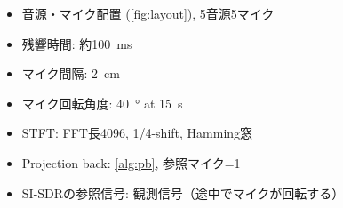 \documentclass[twocolumn,9pt,dvipdfmx]{article}
\begin{document}
\begin{itemize}
  \item 音源・マイク配置 (\cref{fig:layout}), 5音源5マイク
  \item 残響時間: 約\SI{100}{\milli\second}
  \item マイク間隔: \SI{2}{\centi\metre}
  \item マイク回転角度: \SI{40}{\degree} at \SI{15}{\second}
  \item STFT: FFT長4096, 1/4-shift, Hamming窓
  \item Projection back: \cref{alg:pb}, 参照マイク=1
  \item SI-SDRの参照信号: 観測信号（途中でマイクが回転する）
\end{itemize}
\end{document}
